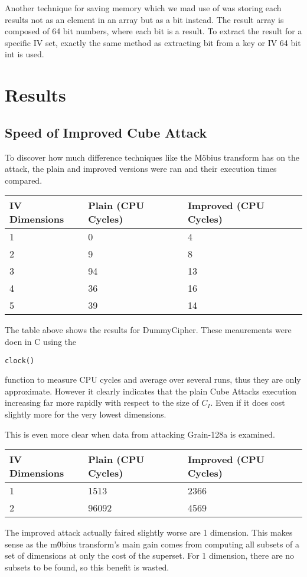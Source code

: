 \documentclass{report}
\let\Oldsection\section
\renewcommand{\section}{\FloatBarrier\Oldsection}
\let\Oldsubsection\subsection
\renewcommand{\subsection}{\FloatBarrier\Oldsubsection}
\begin{document}
Another technique for saving memory which we mad use of was storing each results not as an element in an array but as a bit instead. The result array is composed of 64 bit numbers, where each bit is a result. To extract the result for a specific IV set, exactly the same method as extracting bit from a key or IV 64 bit int is used.

\section{Results}
\subsection{Speed of Improved Cube Attack}
To discover how much difference techniques like the M\"{o}bius transform has on the attack, the plain and improved versions were ran and their execution times compared.
\begin{center}
    \begin{tabular}{| l | l | l |}
    \hline
    IV Dimensions & Plain (CPU Cycles) & Improved (CPU Cycles)\\ \hline
    1 & 0 & 4\\ \hline
    2 & 9 & 8\\ \hline
    3 & 94 & 13\\ \hline
    4 & 36 & 16\\ \hline
    5 & 39 & 14\\ \hline
    \end{tabular}
\end{center}
The table above shows the results for DummyCipher. These meaurements were doen in C using the \begin{verbatim}
clock()
\end{verbatim} function to measure CPU cycles and average over several runs, thus they are only approximate. However it clearly indicates that the plain Cube Attacks execution increasing far more rapidly with respect to the size of $C_I$. Even if it does cost slightly more for the very lowest dimensions.

This is even more clear when  data from attacking Grain-128a is examined.

\begin{center}
    \begin{tabular}{| l | l | l |}
    \hline
    IV Dimensions & Plain (CPU Cycles) & Improved (CPU Cycles)\\ \hline
    1 & 1513 & 2366\\ \hline
    2 & 96092 & 4569\\ \hline
    \end{tabular}
\end{center}
The improved attack actually faired slightly worse are 1 dimension. This makes sense as the m\"{0}bius transform's main gain comes from computing all subsets of a set of dimensions at only the cost of the superset. For 1 dimension, there are no subsets to be found, so this benefit is wasted.
\end{document}
